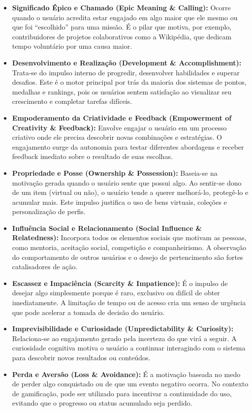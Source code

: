 \begin{itemize}
    \item \textbf{Significado Épico e Chamado (Epic Meaning \& Calling):} Ocorre quando o usuário acredita estar engajado em algo maior que ele mesmo ou que foi ``escolhido'' para uma missão. É o pilar que motiva, por exemplo, contribuidores de projetos colaborativos como a Wikipédia, que dedicam tempo voluntário por uma causa maior.

    \item \textbf{Desenvolvimento e Realização (Development \& Accomplishment):} Trata-se do impulso interno de progredir, desenvolver habilidades e superar desafios. Este é o motor principal por trás da maioria dos sistemas de pontos, medalhas e rankings, pois os usuários sentem satisfação ao visualizar seu crescimento e completar tarefas difíceis.

    \item \textbf{Empoderamento da Criatividade e Feedback (Empowerment of Creativity \& Feedback):} Envolve engajar o usuário em um processo criativo onde ele precisa descobrir novas combinações e estratégias. O engajamento surge da autonomia para testar diferentes abordagens e receber feedback imediato sobre o resultado de suas escolhas.

    \item \textbf{Propriedade e Posse (Ownership \& Possession):} Baseia-se na motivação gerada quando o usuário sente que possui algo. Ao sentir-se dono de um item (virtual ou não), o usuário tende a querer melhorá-lo, protegê-lo e acumular mais. Este impulso justifica o uso de bens virtuais, coleções e personalização de perfis.

    \item \textbf{Influência Social e Relacionamento (Social Influence \& Relatedness):} Incorpora todos os elementos sociais que motivam as pessoas, como mentoria, aceitação social, competição e companheirismo. A observação do comportamento de outros usuários e o desejo de pertencimento são fortes catalisadores de ação.

    \item \textbf{Escassez e Impaciência (Scarcity \& Impatience):} É o impulso de desejar algo simplesmente porque é raro, exclusivo ou difícil de obter imediatamente. A limitação de tempo ou de acesso cria um senso de urgência que pode acelerar a tomada de decisão do usuário.

    \item \textbf{Imprevisibilidade e Curiosidade (Unpredictability \& Curiosity):} Relaciona-se ao engajamento gerado pela incerteza do que virá a seguir. A curiosidade cognitiva motiva o usuário a continuar interagindo com o sistema para descobrir novos resultados ou conteúdos.

    \item \textbf{Perda e Aversão (Loss \& Avoidance):} É a motivação baseada no medo de perder algo conquistado ou de que um evento negativo ocorra. No contexto de gamificação, pode ser utilizado para incentivar a continuidade do uso, evitando que o progresso ou status acumulado seja perdido.
\end{itemize}

